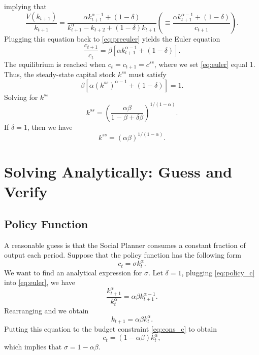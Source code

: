 \documentclass[10pt,a4paper]{article}
\begin{document}
implying that
\begin{equation}
	 \frac{V(k_{t+1})}{k_{t+1}} = \frac{\alpha k_{t+1}^{\alpha-1} + (1-\delta)}{k_{t+1}^\alpha - k_{t+2} + (1-\delta)k_{t+1}} \left(\equiv \frac{\alpha k_{t+1}^{\alpha-1} + (1-\delta)}{c_{t+1}} \right).
\end{equation}
Plugging this equation back to \eqref{eq:preeuler} yields the Euler equation
\begin{equation}
	\label{eq:euler} \frac{c_{t+1}}{c_t} = \beta [\alpha k_{t+1}^{\alpha-1} + (1-\delta)].
\end{equation}
The equilibrium is reached when $c_t = c_{t+1} = c^{ss}$, where we set \eqref{eq:euler} equal 1. Thus, the steady-state capital stock $k^{ss}$ must satisfy
\begin{equation*}
	\beta [\alpha (k^{ss})^{\alpha-1} + (1-\delta)] = 1.
\end{equation*} 
Solving for $k^{ss}$
\begin{equation}
	\label{eq:kss} k^{ss} = \left(\frac{\alpha\beta}{1-\beta + \delta \beta }\right)^{1/(1-\alpha)}.
\end{equation}
If $\delta=1$, then we have
\begin{equation}
	k^{ss} = (\alpha\beta)^{1/(1-\alpha)}.
\end{equation}

\section{Solving Analytically: Guess and Verify}
\subsection{Policy Function}
A reasonable guess is that the Social Planner consumes a constant fraction of output each period. Suppose that the policy function has the following form
\begin{equation}
	\label{eq:policy_c} c_t = \sigma k_t^\alpha.
\end{equation}
We want to find an analytical expression for $\sigma$. Let $\delta=1$, plugging \eqref{eq:policy_c} into \eqref{eq:euler}, we have
\begin{equation}
	\frac{k^\alpha_{t+1}}{k^\alpha_t} = \alpha \beta k_{t+1}^{\alpha-1}.
\end{equation}
Rearranging and we obtain
\begin{equation}
	\label{eq:valf_k1} k_{t+1} = \alpha\beta k_t^\alpha.
\end{equation}
Putting this equation to the budget constraint \eqref{eq:cons_c} to obtain
\begin{equation}
	\label{eq:valf_c1} c_t = (1-\alpha\beta)k_t^\alpha,
\end{equation}
which implies that $\sigma = 1-\alpha\beta$.
\end{document}

